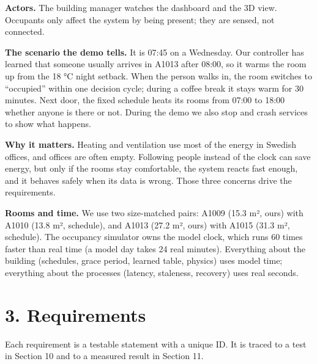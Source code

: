 \documentclass[11pt]{article}
\begin{document}
\textbf{Actors.} The building manager watches the dashboard and the 3D view. Occupants only
affect the system by being present; they are sensed, not connected.

\textbf{The scenario the demo tells.} It is 07:45 on a Wednesday. Our controller has learned that
someone usually arrives in A1013 after 08:00, so it warms the room up from the 18 °C night
setback. When the person walks in, the room switches to ``occupied'' within one decision cycle;
during a coffee break it stays warm for 30 minutes. Next door, the fixed schedule heats its
rooms from 07:00 to 18:00 whether anyone is there or not. During the demo we also stop and
crash services to show what happens.

\textbf{Why it matters.} Heating and ventilation use most of the energy in Swedish offices, and
offices are often empty. Following people instead of the clock can save energy, but only if
the rooms stay comfortable, the system reacts fast enough, and it behaves safely when its
data is wrong. Those three concerns drive the requirements.

\textbf{Rooms and time.} We use two size-matched pairs: A1009 (15.3 m², ours) with A1010 (13.8 m²,
schedule), and A1013 (27.2 m², ours) with A1015 (31.3 m², schedule). The occupancy simulator owns
the model clock, which runs 60 times faster than real time (a model day takes 24 real minutes).
Everything about the building (schedules, grace period, learned table, physics) uses model time;
everything about the processes (latency, staleness, recovery) uses real seconds.

\section{3. Requirements}\label{requirements}

Each requirement is a testable statement with a unique ID. It is traced to a test in Section 10
and to a measured result in Section 11.
\end{document}
